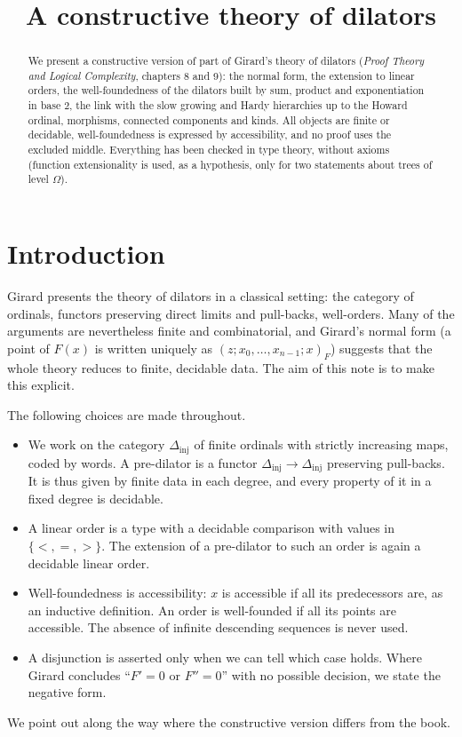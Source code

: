 \documentclass[11pt,a4paper]{article}
\title{A constructive theory of dilators}
\author{}
\date{}
\theoremstyle{definition}
\theoremstyle{remark}
\newcommand{\Dinj}{\Delta_{\mathrm{inj}}}
\begin{document}
\maketitle

\begin{abstract}
We present a constructive version of part of Girard's theory of dilators
(\emph{Proof Theory and Logical Complexity}, chapters 8 and 9): the normal
form, the extension to linear orders, the well-foundedness of the dilators
built by sum, product and exponentiation in base $2$, the link with the
slow growing and Hardy hierarchies up to the Howard ordinal, morphisms,
connected components and kinds. All objects are finite or decidable,
well-foundedness is expressed by accessibility, and no proof uses the
excluded middle. Everything has been checked in type theory, without
axioms (function extensionality is used, as a hypothesis, only for two
statements about trees of level $\Omega$).
\end{abstract}

\section{Introduction}

Girard presents the theory of dilators in a classical setting: the
category of ordinals, functors preserving direct limits and pull-backs,
well-orders. Many of the arguments are nevertheless finite and
combinatorial, and Girard's normal form (a point of $F(x)$ is written
uniquely as $(z;x_0,\dots,x_{n-1};x)_F$) suggests that the whole theory
reduces to finite, decidable data. The aim of this note is to make this
explicit.

The following choices are made throughout.
\begin{itemize}
\item We work on the category $\Dinj$ of finite ordinals with strictly
  increasing maps, coded by words. A pre-dilator is a functor
  $\Dinj \to \Dinj$ preserving pull-backs. It is thus given by finite data
  in each degree, and every property of it in a fixed degree is
  decidable.
\item A linear order is a type with a decidable comparison with values in
  $\{<,=,>\}$. The extension of a pre-dilator to such an order is again a
  decidable linear order.
\item Well-foundedness is accessibility: $x$ is accessible if all its
  predecessors are, as an inductive definition. An order is well-founded
  if all its points are accessible. The absence of infinite descending
  sequences is never used.
\item A disjunction is asserted only when we can tell which case holds.
  Where Girard concludes ``$F' = 0$ or $F'' = 0$'' with no possible
  decision, we state the negative form.
\end{itemize}
We point out along the way where the constructive version differs from
the book.
\end{document}
